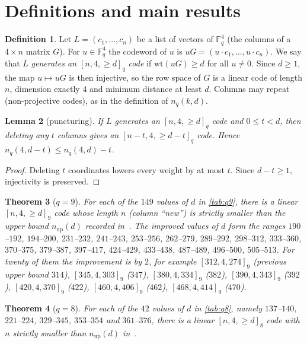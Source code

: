 \documentclass[11pt]{article}
\numberwithin{equation}{section}
\newtheorem{theorem}{Theorem}[section]
\newtheorem{lemma}[theorem]{Lemma}
\theoremstyle{definition}
\newtheorem{definition}[theorem]{Definition}
\theoremstyle{remark}
\newcommand{\F}{\mathbb F}
\newcommand{\wt}{\mathrm{wt}}
\begin{document}
\section{Definitions and main results}

\begin{definition}
Let $L=(c_1,\dots,c_n)$ be a list of vectors of $\F_q^4$ (the columns of a $4\times n$ matrix $G$).
For $u\in\F_q^4$ the codeword of $u$ is $uG=(u\cdot c_1,\dots,u\cdot c_n)$. We say that $L$
\emph{generates an $[n,4,\ge d]_q$ code} if $\wt(uG)\ge d$ for all $u\ne 0$. Since $d\ge1$, the map
$u\mapsto uG$ is then injective, so the row space of $G$ is a linear code of length $n$, dimension
exactly $4$ and minimum distance at least $d$. Columns may repeat (non-projective codes), as in the
definition of $n_q(k,d)$.
\end{definition}

\begin{lemma}[puncturing]\label{lem:punct}
If $L$ generates an $[n,4,\ge d]_q$ code and $0\le t<d$, then deleting any $t$ columns gives an
$[n-t,4,\ge d-t]_q$ code. Hence $n_q(4,d-t)\le n_q(4,d)-t$.
\end{lemma}
\begin{proof}
Deleting $t$ coordinates lowers every weight by at most $t$. Since $d-t\ge1$, injectivity is preserved.
\end{proof}

\begin{theorem}[$q=9$]\label{thm:q9}
For each of the $149$ values of $d$ in \cref{tab:q9}, there is a linear $[n,4,\ge d]_9$ code whose
length $n$ (column ``new'') is strictly smaller than the upper bound $n_{\mathrm{up}}(d)$ recorded
in~\cite{MarutaTable}. The improved values of $d$ form the ranges
$190$--$192$, $194$--$200$, $231$--$232$, $241$--$243$, $253$--$256$, $262$--$279$, $289$--$292$,
$298$--$312$, $333$--$360$, $370$--$375$, $379$--$387$, $397$--$417$, $424$--$429$, $433$--$438$,
$487$--$489$, $496$--$500$, $505$--$513$. For twenty of them the improvement is by $2$, for example
$[312,4,274]_9$ (previous upper bound $314$), $[345,4,303]_9$ ($347$), $[380,4,334]_9$ ($382$),
$[390,4,343]_9$ ($392$), $[420,4,370]_9$ ($422$), $[460,4,406]_9$ ($462$), $[468,4,414]_9$ ($470$).
\end{theorem}

\begin{theorem}[$q=8$]\label{thm:q8}
For each of the $42$ values of $d$ in \cref{tab:q8}, namely $137$--$140$, $221$--$224$,
$329$--$345$, $353$--$354$ and $361$--$376$, there is a linear $[n,4,\ge d]_8$ code with $n$
strictly smaller than $n_{\mathrm{up}}(d)$ in~\cite{MarutaTable}.
\end{theorem}
\end{document}
